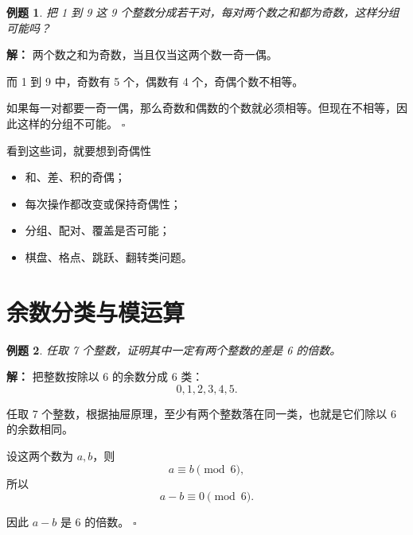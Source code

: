 \documentclass[11pt,a4paper,fontset=fandol]{ctexart}
\theoremstyle{formaltheorem}
\theoremstyle{formalexample}
\newtheorem{example}{例题}[section]
\newenvironment{solution}{\par\noindent\textbf{解：}}{\hfill$\square$\par}
\begin{document}
\begin{center}
\end{center}

\begin{example}
把 1 到 9 这 9 个整数分成若干对，每对两个数之和都为奇数，这样分组可能吗？
\end{example}

\begin{solution}
两个数之和为奇数，当且仅当这两个数一奇一偶。

而 1 到 9 中，奇数有 5 个，偶数有 4 个，奇偶个数不相等。

如果每一对都要一奇一偶，那么奇数和偶数的个数就必须相等。但现在不相等，因此这样的分组不可能。
\end{solution}

\begin{skillbox}{看到这些词，就要想到奇偶性}
\begin{itemize}
  \item 和、差、积的奇偶；
  \item 每次操作都改变或保持奇偶性；
  \item 分组、配对、覆盖是否可能；
  \item 棋盘、格点、跳跃、翻转类问题。
\end{itemize}
\end{skillbox}

\section{余数分类与模运算}

\begin{example}
任取 7 个整数，证明其中一定有两个整数的差是 6 的倍数。
\end{example}

\begin{solution}
把整数按除以 6 的余数分成 6 类：
\[
0,1,2,3,4,5.
\]

任取 7 个整数，根据抽屉原理，至少有两个整数落在同一类，也就是它们除以 6 的余数相同。

设这两个数为 $a,b$，则
\[
a\equiv b\pmod 6,
\]
所以
\[
a-b\equiv 0\pmod 6.
\]

因此 $a-b$ 是 6 的倍数。
\end{solution}
\end{document}
